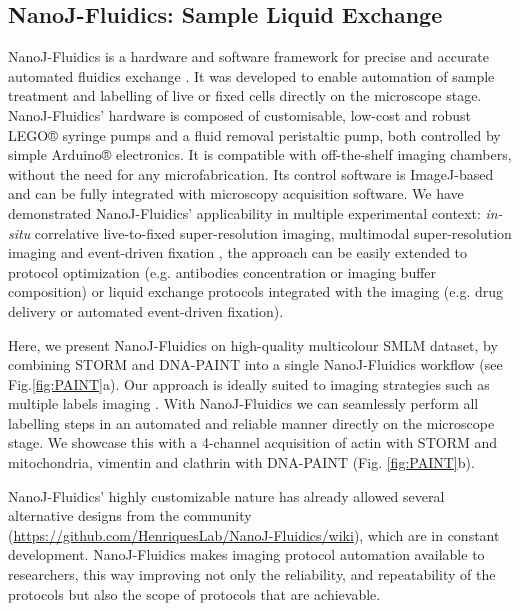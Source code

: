 \subsection*{NanoJ-Fluidics: Sample Liquid Exchange}
NanoJ-Fluidics is a hardware and software framework for precise and accurate automated fluidics exchange \cite{almada2018automating}. It was developed to enable automation of sample treatment and labelling of live or fixed cells directly on the microscope stage. NanoJ-Fluidics' hardware is composed of customisable, low-cost and robust LEGO® syringe pumps and a fluid removal peristaltic pump, both controlled by simple Arduino® electronics. It is compatible with off-the-shelf imaging chambers, without the need for any microfabrication. Its control software is ImageJ-based and can be fully integrated with microscopy acquisition software. We have demonstrated NanoJ-Fluidics' applicability in multiple experimental context: \textit{in-situ} correlative live-to-fixed super-resolution imaging, multimodal super-resolution imaging and event-driven fixation \cite{almada2018automating}, the approach can be easily  extended to protocol optimization (e.g. antibodies concentration or imaging buffer composition) or liquid exchange protocols integrated with the imaging (e.g. drug delivery or automated event-driven fixation).

Here, we present NanoJ-Fluidics on high-quality multicolour SMLM dataset, by combining STORM and DNA-PAINT \cite{jungmann2014multiplexed} into a single NanoJ-Fluidics workflow (see Fig.\ref{fig:PAINT}a). Our approach is ideally suited to imaging strategies such as multiple labels imaging \cite{dempsey2011evaluation}. With NanoJ-Fluidics we can seamlessly perform all labelling steps in an automated and reliable manner directly on the microscope stage. We showcase this with a 4-channel acquisition of actin with STORM and mitochondria, vimentin and clathrin with DNA-PAINT (Fig. \ref{fig:PAINT}b). 

NanoJ-Fluidics' highly customizable nature has already allowed several alternative designs from the community (\href{https://github.com/HenriquesLab/NanoJ-Fluidics/wiki}{https://github.com/HenriquesLab/NanoJ-Fluidics/wiki}), which are in constant development. NanoJ-Fluidics makes imaging protocol automation available to researchers, this way improving not only the reliability, and repeatability of the protocols but also the scope of protocols that are achievable.  

